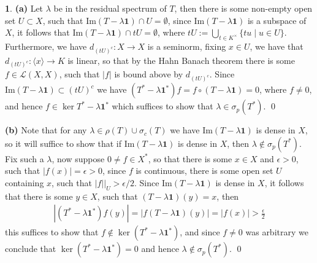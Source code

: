 \documentclass[11pt]{article}
\theoremstyle{definition}
\newtheorem{pb}{}
\newcommand{\set}[1]{\{#1\}}
\newcommand{\abs}[1]{\left\vert#1\right\vert}
\newcommand{\im}{\text{Im}}
\newcommand{\gen}[1]{\langle #1 \rangle}
\begin{document}
    \begin{pb}
        \textbf{(a)} Let \(\lambda\) be in the residual spectrum of \(T\), then there is some non-empty open set \(U \subset X\), such that \(\im(T - \lambda\mathbf{1}) \cap U = \emptyset\), since \(\im(T - \lambda\mathbf{1})\) is a subspace of \(X\), it follows that \(\im(T - \lambda\mathbf{1}) \cap t U = \emptyset\), where \(tU := \bigcup_{t \in K^\times}\set{tu \mid u \in U}\). Furthermore, we have \(d_{(tU)^c}: X \to X\) is a seminorm, fixing \(x \in U\), we have that \(d_{(tU)^c}: \gen{x} \to K\) is linear, so that by the Hahn Banach theorem there is some \(f \in \mathcal{L}(X,X)\), such that \(\abs{f}\) is bound above by \(d_{(tU)^c}\). Since \(\im(T - \lambda\mathbf{1}) \subset (tU)^c\) we have \((T^* - \lambda\mathbf{1}^*)f =  f\circ(T - \lambda\mathbf{1}) = 0\), where \(f \neq 0\), and hence \(f \in \ker T^* - \lambda\mathbf{1}^*\) which suffices to show that \(\lambda \in \sigma_p(T^*)\). \qed

        \textbf{(b)} Note that for any \(\lambda \in \rho(T)\cup\sigma_c(T)\) we have \(\im(T-\lambda\mathbf{1})\) is dense in \(X\), so it will suffice to show that if \(\im(T-\lambda\mathbf{1})\) is dense in \(X\), then \(\lambda \not \in \sigma_p(T^*)\). Fix such a \(\lambda\), now suppose \(0 \neq f \in X^*\), so that there is some \(x \in X\) and \(\epsilon > 0\), such that \(\abs{f(x)} = \epsilon > 0\), since \(f\) is continuous, there is some open set \(U\) containing \(x\), such that \(\abs{f}\vert_U > \epsilon/2\). Since \(\im(T - \lambda\mathbf{1})\) is dense in \(X\), it follows that there is some \(y \in X\), such that \((T - \lambda\mathbf{1})(y) = x\), then
        \begin{align*}
            \abs{(T^* - \lambda\mathbf{1}^*)f(y)} = \abs{f(T - \lambda\mathbf{1})(y)} = \abs{f(x)} > \frac{\epsilon}{2}
        \end{align*}
        this suffices to show that \(f \not \in \ker(T^* - \lambda\mathbf{1}^*)\), and since \(f \neq 0\) was arbitrary we conclude that \(\ker(T^* - \lambda\mathbf{1}^*) = 0\) and hence \(\lambda \not \in \sigma_p(T^*)\). \qed
        

\end{pb}
\end{document}

